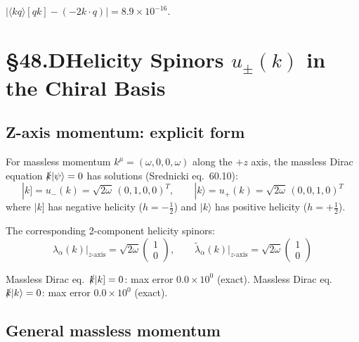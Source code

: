 \documentclass[12pt]{article}
\newcommand{\verified}[1]{\textcolor{verifygreen}{\checkmark\; #1}}
\begin{document}
\verified{$|\langle kq\rangle[qk] - (-2k\cdot q)| = 8.9\times10^{-16}$.}

\section{§48.D\quad Helicity Spinors $u_\pm(k)$ in the Chiral Basis}

\subsection{Z-axis momentum: explicit form}

For massless momentum $k^\mu=(\omega,0,0,\omega)$ along the $+z$ axis,
the massless Dirac equation $\slashed{k}|\psi\rangle=0$ has solutions
(Srednicki eq.~60.10):
\begin{equation}
  |k] = u_-(k) = \sqrt{2\omega}\,(0,1,0,0)^T,
  \qquad
  |k\rangle = u_+(k) = \sqrt{2\omega}\,(0,0,1,0)^T
  \tag{48.9}
\end{equation}
where $|k]$ has negative helicity ($h=-\tfrac12$) and $|k\rangle$ has positive helicity ($h=+\tfrac12$).

The corresponding 2-component helicity spinors:
\begin{equation}
  \lambda_\alpha(k)\big|_{z\text{-axis}} = \sqrt{2\omega}\begin{pmatrix}1\\0\end{pmatrix},
  \qquad
  \tilde\lambda_{\dot\alpha}(k)\big|_{z\text{-axis}} = \sqrt{2\omega}\begin{pmatrix}1\\0\end{pmatrix}
  \tag{48.10}
\end{equation}

\verified{Massless Dirac eq.\ $\slashed{k}|k] = 0$: max error $0.0\times10^0$ (exact).}
\verified{Massless Dirac eq.\ $\slashed{k}|k\rangle = 0$: max error $0.0\times10^0$ (exact).}

\subsection{General massless momentum}
\end{document}
